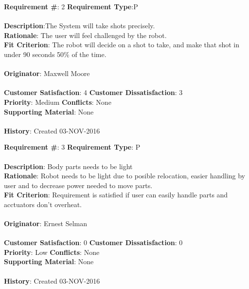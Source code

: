 \documentclass[titlepage]{article}
\begin{document}
\begin{framed}
	\noindent\textbf{Requirement \#}: 2 \hfill \textbf{Requirement Type}:P\hfill\\\\
	\noindent\textbf{Description}:The System will take shots precisely.\\
	\textbf{Rationale}: The user will feel challenged by the robot.\\
	\textbf{Fit Criterion}: The robot will decide on a shot to take, and make that shot in under 90 seconds 50\% of the time.\\\\
	\textbf{Originator}: Maxwell Moore\\\\
	\noindent\textbf{Customer Satisfaction}: 4 \hfill 	\textbf{Customer Dissatisfaction}: 3\hfill\\
	\textbf{Priority}: Medium \hfill \textbf{Conflicts}: None \hfill\\
	\textbf{Supporting Material}: None\\\\
	\noindent\textbf{History}: Created 03-NOV-2016
\end{framed}

\begin{framed}
	\noindent\textbf{Requirement \#}: 3 \hfill \textbf{Requirement Type}: P \hfill\\\\
	\noindent\textbf{Description}: Body parts needs to be light \\
	\textbf{Rationale}: Robot needs to be light due to posible relocation, easier handling by user and to decrease power needed to move parts. \\
	\textbf{Fit Criterion}: Requirement is satisfied if user can easily handle parts and acctuators don't overheat. \\\\
	\textbf{Originator}: Ernest Selman\\\\
	\noindent\textbf{Customer Satisfaction}: 0 \hfill 	\textbf{Customer Dissatisfaction}: 0 \hfill\\
	\textbf{Priority}: Low \hfill \textbf{Conflicts}: None \hfill\\
	\textbf{Supporting Material}: None\\\\
	\noindent\textbf{History}: Created 03-NOV-2016
\end{framed}
\end{document}
